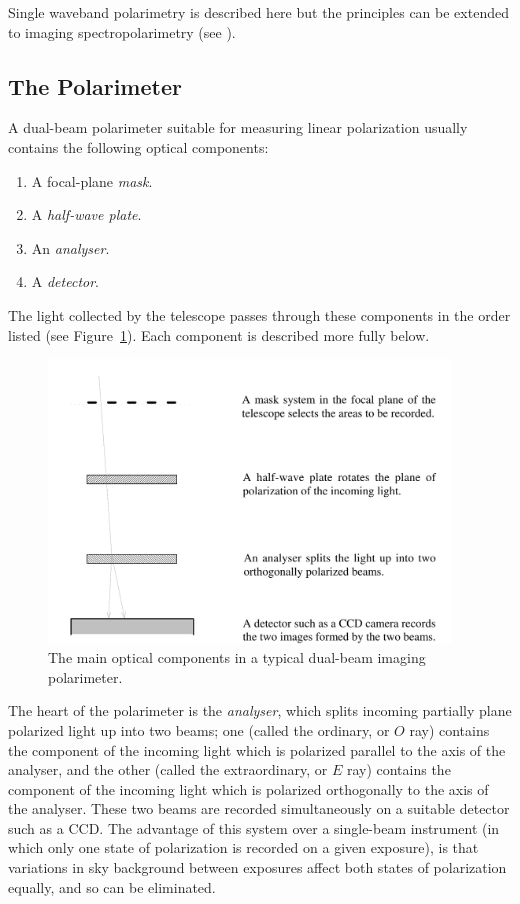 \documentclass[twoside,11pt]{starlink}
\begin{document}
Single waveband polarimetry is described here but the principles can be
extended to imaging spectropolarimetry (see ).

\subsection{The Polarimeter}
A dual-beam polarimeter suitable for measuring linear polarization usually
contains the following optical components:

\begin{enumerate}
\item A focal-plane \emph{mask}.
\item A \emph{half-wave plate}.
\item An \emph{analyser}.
\item A \emph{detector}.
\end{enumerate}

The light collected by the telescope passes through these components in
the order listed (see Figure~\ref{fig:optical}).
Each component is described more fully below.

  \begin{figure}[htb]
  \begin{center}
  \includegraphics[clip,width=0.95\textwidth]{sun223_figures/optical}
  \caption{The main optical components in a typical dual-beam imaging polarimeter.}
  \label{fig:optical}
  \end{center}
  \end{figure}

The heart of the polarimeter is the \emph{analyser}, which splits incoming
partially plane polarized light up into two beams; one (called the
ordinary, or $O$ ray) contains the component of the incoming light
which is polarized parallel to the axis of the analyser, and the other
(called the extraordinary, or $E$ ray) contains the component of the
incoming light which is polarized orthogonally to the axis of the
analyser. These two beams are recorded simultaneously on a suitable
detector such as a CCD. The advantage of this system over a single-beam
instrument (in which only one state of polarization is recorded on a
given exposure), is that variations in sky background between exposures
affect both states of polarization equally, and so can be eliminated.
\end{document}

